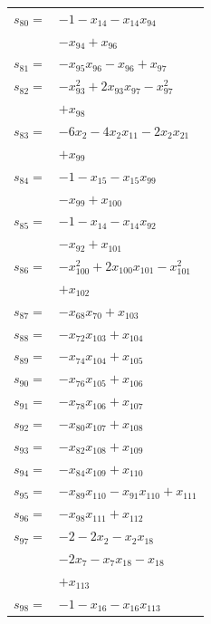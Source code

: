 \begin{longtable}{@{}r@{\;}l@{}}
\(s_{80}=\) & \(\displaystyle -1 -x_{14} -x_{14}x_{94}\) \\
 & \(\displaystyle -x_{94} +x_{96}\) \\[3pt]
\(s_{81}=\) & \(\displaystyle -x_{95}x_{96} -x_{96} +x_{97}\) \\[3pt]
\(s_{82}=\) & \(\displaystyle -x_{93}^{2} +2x_{93}x_{97} -x_{97}^{2}\) \\
 & \(\displaystyle +x_{98}\) \\[3pt]
\(s_{83}=\) & \(\displaystyle -6x_{2} -4x_{2}x_{11} -2x_{2}x_{21}\) \\
 & \(\displaystyle +x_{99}\) \\[3pt]
\(s_{84}=\) & \(\displaystyle -1 -x_{15} -x_{15}x_{99}\) \\
 & \(\displaystyle -x_{99} +x_{100}\) \\[3pt]
\(s_{85}=\) & \(\displaystyle -1 -x_{14} -x_{14}x_{92}\) \\
 & \(\displaystyle -x_{92} +x_{101}\) \\[3pt]
\(s_{86}=\) & \(\displaystyle -x_{100}^{2} +2x_{100}x_{101} -x_{101}^{2}\) \\
 & \(\displaystyle +x_{102}\) \\[3pt]
\(s_{87}=\) & \(\displaystyle -x_{68}x_{70} +x_{103}\) \\[3pt]
\(s_{88}=\) & \(\displaystyle -x_{72}x_{103} +x_{104}\) \\[3pt]
\(s_{89}=\) & \(\displaystyle -x_{74}x_{104} +x_{105}\) \\[3pt]
\(s_{90}=\) & \(\displaystyle -x_{76}x_{105} +x_{106}\) \\[3pt]
\(s_{91}=\) & \(\displaystyle -x_{78}x_{106} +x_{107}\) \\[3pt]
\(s_{92}=\) & \(\displaystyle -x_{80}x_{107} +x_{108}\) \\[3pt]
\(s_{93}=\) & \(\displaystyle -x_{82}x_{108} +x_{109}\) \\[3pt]
\(s_{94}=\) & \(\displaystyle -x_{84}x_{109} +x_{110}\) \\[3pt]
\(s_{95}=\) & \(\displaystyle -x_{89}x_{110} -x_{91}x_{110} +x_{111}\) \\[3pt]
\(s_{96}=\) & \(\displaystyle -x_{98}x_{111} +x_{112}\) \\[3pt]
\(s_{97}=\) & \(\displaystyle -2 -2x_{2} -x_{2}x_{18}\) \\
 & \(\displaystyle -2x_{7} -x_{7}x_{18} -x_{18}\) \\
 & \(\displaystyle +x_{113}\) \\[3pt]
\(s_{98}=\) & \(\displaystyle -1 -x_{16} -x_{16}x_{113}\) \\

\end{longtable}
